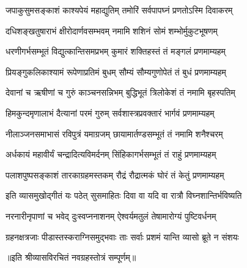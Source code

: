 

\twolineshloka
{जपाकुसुमसङ्काशं काश्यपेयं महाद्युतिम्}
{तमोरिं सर्वपापघ्नं प्रणतोऽस्मि दिवाकरम्}

\twolineshloka
{दधिशङ्खतुषाराभं क्षीरोदार्णवसम्भवम्}
{नमामि शशिनं सोमं शम्भोर्मुकुटभूषणम्}

\twolineshloka
{धरणीगर्भसम्भूतं विद्युत्कान्तिसमप्रभम्}
{कुमारं शक्तिहस्तं तं मङ्गलं प्रणमाम्यहम्}

\twolineshloka
{प्रियङ्गुकलिकाश्यामं रूपेणाप्रतिमं बुधम्}
{सौम्यं सौम्यगुणोपेतं तं बुधं प्रणमाम्यहम्}

\twolineshloka
{देवानां च ऋषीणां च गुरुं काञ्चनसन्निभम्}
{बुद्धिभूतं त्रिलोकेशं तं नमामि बृहस्पतिम्}

\twolineshloka
{हिमकुन्दमृणालाभं दैत्यानां परमं गुरुम्}
{सर्वशास्त्रप्रवक्तारं भार्गवं प्रणमाम्यहम्}

\twolineshloka
{नीलाञ्जनसमाभासं रविपुत्रं यमाग्रजम्}
{छायामार्तण्डसम्भूतं तं नमामि शनैश्चरम्}

\twolineshloka
{अर्धकायं महावीर्यं चन्द्रादित्यविमर्दनम्}
{सिंहिकागर्भसम्भूतं तं राहुं प्रणमाम्यहम्}

\twolineshloka
{पलाशपुष्पसङ्काशं तारकाग्रहमस्तकम्}
{रौद्रं रौद्रात्मकं घोरं तं केतुं प्रणमाम्यहम्}

\twolineshloka
{इति व्यासमुखोद्गीतं यः पठेत् सुसमाहितः}
{दिवा वा यदि वा रात्रौ विघ्नशान्तिर्भविष्यति}

\twolineshloka
{नरनारीनृपाणां च भवेद् दुःस्वप्ननाशनम्}
{ऐश्वर्यमतुलं तेषामारोग्यं पुष्टिवर्धनम्}

\twolineshloka
{ग्रहनक्षत्रजाः पीडास्तस्कराग्निसमुद्भवाः}
{ताः सर्वाः प्रशमं यान्ति व्यासो ब्रूते न संशयः}

॥इति श्रीव्यासविरचितं नवग्रहस्तोत्रं सम्पूर्णम्॥
